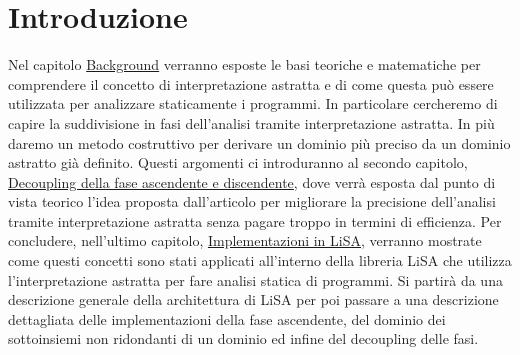 \chapter*{Introduzione} %

Nel capitolo \hyperref[chapter:background]{Background} verranno esposte le basi teoriche e matematiche per comprendere il concetto di interpretazione astratta e di come questa può essere utilizzata per analizzare staticamente i programmi. In particolare cercheremo di capire la suddivisione in fasi dell'analisi tramite interpretazione astratta. In più daremo un metodo costruttivo per derivare un dominio più preciso da un dominio astratto già definito. Questi argomenti ci introduranno al secondo capitolo, \hyperref[chapter:decoupling]{Decoupling della fase ascendente e discendente}, dove verrà esposta dal punto di vista teorico l'idea proposta dall'articolo \cite{DBLP:conf/aplas/ArceriMZ22} per migliorare la precisione dell'analisi tramite interpretazione astratta senza pagare troppo in termini di efficienza. Per concludere, nell'ultimo capitolo, \hyperref[chapter:lisa]{Implementazioni in LiSA}, verranno mostrate come questi concetti sono stati applicati all'interno della libreria LiSA che utilizza l'interpretazione astratta per fare analisi statica di programmi. Si partirà da una descrizione generale della architettura di LiSA per poi passare a una descrizione dettagliata delle implementazioni della fase ascendente, del dominio dei sottoinsiemi non ridondanti di un dominio ed infine del decoupling delle fasi.